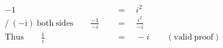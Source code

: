 \begin{align*}
-1\quad&\,=\quad i^2\\
\mathrm{/~(-i)~both~sides}\qquad\frac{-1}{-i}\quad&\,=\quad\frac{i^2}{-i}\\
\mathrm{Thus}\qquad\frac{1}{i}\quad&\,=\quad-i\qquad\mathrm{(valid~proof)}
\end{align*}
